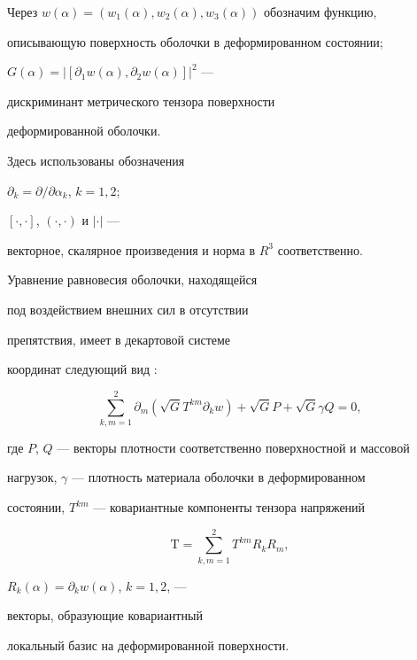 Через $w(\alpha)=(w_1(\alpha),w_2(\alpha),w_3(\alpha))$ обозначим функцию,


описывающую поверхность оболочки в деформированном состоянии;


$G(\alpha)={| [\partial_1 w(\alpha),\partial_2 w(\alpha) ] |}^2$ --- 


дискриминант метрического тензора поверхности 


деформированной оболочки.





Здесь использованы обозначения


$\partial_k={\partial}/{\partial \alpha_k}$, $k=1,2$;


$[\cdot,\cdot]$, $(\cdot,\cdot)$ и $| \cdot |$ --- 


векторное, скалярное произведения и норма в $R^{3}$ соответственно.





Уравнение равновесия оболочки, находящейся 


под воздействием внешних сил в отсутствии


препятствия, имеет в декартовой системе 


координат следующий вид \cite{R_Gul}:


\begin{equation}


\sum_{k,m=1}^{2} \partial_m (\sqrt G T^{km} \partial_k w )+


\sqrt G P+\sqrt G \gamma Q=0, 


\label{Ur_Rav}


\end{equation}


где $P$, $Q$ --- векторы плотности соответственно поверхностной и массовой 


нагрузок, $\gamma$ --- плотность материала оболочки в деформированном 


состоянии, $T^{km}$ --- ковариантные компоненты тензора напряжений


$$


{\mathrm T}=\sum_{k,m=1}^{2} T^{km}R_k R_m,


$$


$R_k(\alpha)=\partial_k w(\alpha)$, $k=1,2$, ---


векторы, образующие ковариантный 


локальный базис на деформированной поверхности. 





